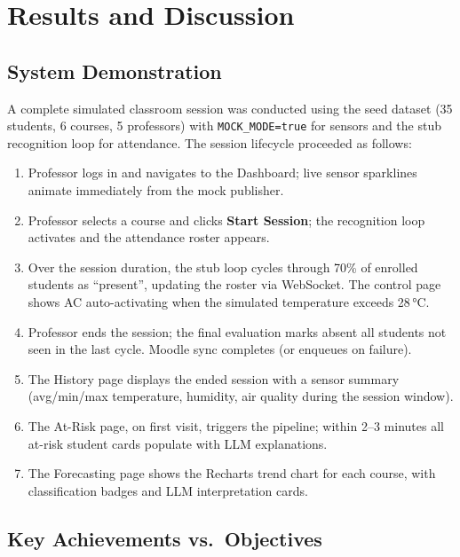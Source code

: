 \section{Results and Discussion}
\label{sec:results}

\subsection{System Demonstration}
\label{subsec:demo}

A complete simulated classroom session was conducted using the seed
dataset (35 students, 6 courses, 5 professors) with
\texttt{MOCK\_MODE=true} for sensors and the stub recognition loop for
attendance.  The session lifecycle proceeded as follows:

\begin{enumerate}
  \item Professor logs in and navigates to the Dashboard; live sensor
    sparklines animate immediately from the mock publisher.
  \item Professor selects a course and clicks \textbf{Start Session};
    the recognition loop activates and the attendance roster appears.
  \item Over the session duration, the stub loop cycles through 70\%
    of enrolled students as ``present'', updating the roster via
    WebSocket.  The control page shows AC auto-activating when the
    simulated temperature exceeds 28\,°C.
  \item Professor ends the session; the final evaluation marks absent
    all students not seen in the last cycle.  Moodle sync completes
    (or enqueues on failure).
  \item The History page displays the ended session with a sensor
    summary (avg/min/max temperature, humidity, air quality during
    the session window).
  \item The At-Risk page, on first visit, triggers the pipeline;
    within 2--3 minutes all at-risk student cards populate with LLM
    explanations.
  \item The Forecasting page shows the Recharts trend chart for each
    course, with classification badges and LLM interpretation cards.
\end{enumerate}

\subsection{Key Achievements vs.\ Objectives}
\label{subsec:achievements}

